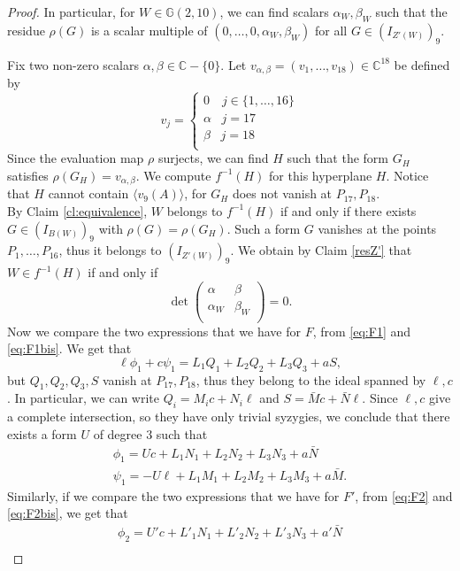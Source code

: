 \documentclass{amsart}
\newcommand{\C}{\mathbb{C}}
\newcommand{\G}{\mathbb{G}}
\theoremstyle{definition}
\begin{document}
\begin{proof}
In particular, for $W\in \G(2,10) $, we can find scalars $\alpha_W, \beta_W$ such that the residue $\rho(G)$ is a scalar multiple
of  $(0,\dots,0,\alpha_W,\beta_W)$ for all $G\in (I_{Z'(W)})_9$.
\smallskip

Fix two non-zero scalars $ \alpha, \beta \in \C-\{0\} $. Let $ v_{\alpha,\beta} = (v_{1}, \ldots, v_{18}) \in \C^{18} $ be defined by 
$$ v_{j} = 
\begin{cases}
0  \,\,\,\,\,\,  j \in \{1, \ldots, 16\} \\
\alpha \,\,\,\,\, j=17 \\
\beta \,\,\,\,\, j = 18 \\
\end{cases} $$
Since the evaluation map $\rho$ surjects, we can find $H$ such that the form $G_H$ satisfies $\rho(G_H)= v_{\alpha,\beta} $. We compute $f^{-1}(H)$
for this hyperplane  $H$. Notice that $H$ cannot contain $\langle v_9(A) \rangle$, for $G_H$ does not vanish at $P_{17},P_{18}$.\\
By Claim \ref{cl:equivalence}, $W$ belongs to $f^{-1}(H)$ if and only if there exists $G\in(I_{B(W)})_9$ with $\rho(G)=\rho(G_H)$. Such a form $G$
vanishes at the points $P_1,\dots,P_{16}$, thus it belongs to $(I_{Z'(W)})_9$. We obtain by Claim \ref{resZ'} that $W\in  f^{-1}(H)$ if and only if 
\begin{equation}\label{eq:hyperplane}
\det \begin{pmatrix} \alpha & \beta \\  \alpha_W& \beta_W\\ \end{pmatrix} = 0. 
\end{equation}
Now we compare the two expressions that we have for $F$, from \eqref{eq:F1} and \eqref{eq:F1bis}. We get that 
$$ \ell \phi_{1} + c \psi_{1} =L_1Q_1+L_2Q_2+L_3Q_3+aS,$$
but $Q_1,Q_2,Q_3,S$ vanish at $P_{17},P_{18}$, thus they belong to the ideal spanned by $\ell,c$. In particular, we can write $Q_i=M_ic+N_i\ell$ and
$S=\bar Mc+\bar N\ell$. Since $\ell,c$ give a complete intersection, so they have only trivial syzygies, we conclude that there exists a form $U$ of degree $3$ such that
\begin{gather*}  \phi_1 = Uc + L_1N_1+L_2N_2+L_3N_3+a\bar N \\
		\psi_1 = -U\ell +L_1M_1+L_2M_2+L_3M_3+a\bar M. 
\end{gather*}
Similarly, if we compare the two expressions that we have for $F'$, from \eqref{eq:F2} and \eqref{eq:F2bis}, we get that 
\begin{gather*}  \phi_2  = U'c + L'_1N_1+L'_2N_2+L'_3N_3+a'\bar N \\

\end{gather*}
\end{proof}
\end{document}
